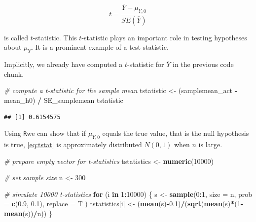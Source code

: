 \documentclass[]{book}
\newenvironment{Shaded}{\begin{snugshade}}{\end{snugshade}}
\newcommand{\KeywordTok}[1]{\textcolor[rgb]{0.13,0.29,0.53}{\textbf{#1}}}
\newcommand{\DataTypeTok}[1]{\textcolor[rgb]{0.13,0.29,0.53}{#1}}
\newcommand{\DecValTok}[1]{\textcolor[rgb]{0.00,0.00,0.81}{#1}}
\newcommand{\FloatTok}[1]{\textcolor[rgb]{0.00,0.00,0.81}{#1}}
\newcommand{\StringTok}[1]{\textcolor[rgb]{0.31,0.60,0.02}{#1}}
\newcommand{\CommentTok}[1]{\textcolor[rgb]{0.56,0.35,0.01}{\textit{#1}}}
\newcommand{\ControlFlowTok}[1]{\textcolor[rgb]{0.13,0.29,0.53}{\textbf{#1}}}
\newcommand{\OperatorTok}[1]{\textcolor[rgb]{0.81,0.36,0.00}{\textbf{#1}}}
\newcommand{\NormalTok}[1]{#1}
\theoremstyle{definition}
\theoremstyle{definition}
\theoremstyle{definition}
\theoremstyle{remark}
\begin{document}
\begin{equation}
t = \frac{\overline{Y} - \mu_{Y,0}}{SE(\overline{Y})} \label{eq:tstat}
\end{equation}

is called \(t\)-statistic. This \(t\)-statistic plays an important role
in testing hypotheses about \(\mu_Y\). It is a prominent example of a
test statistic.

Implicitly, we already have computed a \(t\)-statistic for
\(\overline{Y}\) in the previous code chunk.

\begin{Shaded}
\begin{Highlighting}[]
\CommentTok{# compute a t-statistic for the sample mean}
\NormalTok{tstatistic <-}\StringTok{ }\NormalTok{(samplemean_act }\OperatorTok{-}\StringTok{ }\NormalTok{mean_h0) }\OperatorTok{/}\StringTok{ }\NormalTok{SE_samplemean}
\NormalTok{tstatistic}
\end{Highlighting}
\end{Shaded}

\begin{verbatim}
## [1] 0.6154575
\end{verbatim}

Using \texttt{R}we can show that if \(\mu_{Y,0}\) equals the true value,
that is the null hypothesis is true, \eqref{eq:tstat} is approximately
distributed \(N(0,1)\) when \(n\) is large.

\begin{Shaded}
\begin{Highlighting}[]
\CommentTok{# prepare empty vector for t-statistics}
\NormalTok{tstatistics <-}\StringTok{ }\KeywordTok{numeric}\NormalTok{(}\DecValTok{10000}\NormalTok{)}

\CommentTok{# set sample size}
\NormalTok{n <-}\StringTok{ }\DecValTok{300}

\CommentTok{# simulate 10000 t-statistics}
\ControlFlowTok{for}\NormalTok{ (i }\ControlFlowTok{in} \DecValTok{1}\OperatorTok{:}\DecValTok{10000}\NormalTok{) \{}
\NormalTok{  s <-}\StringTok{ }\KeywordTok{sample}\NormalTok{(}\DecValTok{0}\OperatorTok{:}\DecValTok{1}\NormalTok{, }
              \DataTypeTok{size =}\NormalTok{ n,  }
              \DataTypeTok{prob =} \KeywordTok{c}\NormalTok{(}\FloatTok{0.9}\NormalTok{, }\FloatTok{0.1}\NormalTok{),}
              \DataTypeTok{replace =}\NormalTok{ T}
\NormalTok{              )}
\NormalTok{  tstatistics[i] <-}\StringTok{ }\NormalTok{(}\KeywordTok{mean}\NormalTok{(s)}\OperatorTok{-}\FloatTok{0.1}\NormalTok{)}\OperatorTok{/}\NormalTok{(}\KeywordTok{sqrt}\NormalTok{(}\KeywordTok{mean}\NormalTok{(s)}\OperatorTok{*}\NormalTok{(}\DecValTok{1}\OperatorTok{-}\KeywordTok{mean}\NormalTok{(s))}\OperatorTok{/}\NormalTok{n))}
\NormalTok{\}}
\end{Highlighting}
\end{Shaded}
\end{document}
